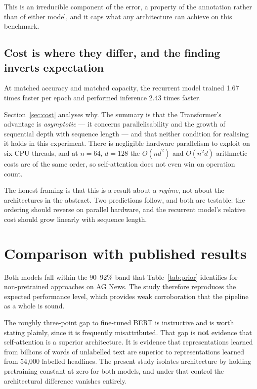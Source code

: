 This is an irreducible component of the error, a property of the annotation rather than of either
model, and it caps what any architecture can achieve on this benchmark.

\subsection{Cost is where they differ, and the finding inverts expectation}

At matched accuracy and matched capacity, the recurrent model trained 1.67 times faster per epoch
and performed inference 2.43 times faster.

Section~\ref{sec:cost} analyses why. The summary is that the Transformer's advantage is
\emph{asymptotic} --- it concerns parallelisability and the growth of sequential depth with
sequence length --- and that neither condition for realising it holds in this experiment. There is
negligible hardware parallelism to exploit on six CPU threads, and at $n = 64$, $d = 128$ the
$O(n d^2)$ and $O(n^2 d)$ arithmetic costs are of the same order, so self-attention does not even
win on operation count.

The honest framing is that this is a result about a \emph{regime}, not about the architectures in
the abstract. Two predictions follow, and both are testable: the ordering should reverse on
parallel hardware, and the recurrent model's relative cost should grow linearly with sequence
length.

\section{Comparison with published results}

Both models fall within the 90--92\% band that Table~\ref{tab:prior} identifies for non-pretrained
approaches on AG News. The study therefore reproduces the expected performance level, which
provides weak corroboration that the pipeline as a whole is sound.

The roughly three-point gap to fine-tuned BERT is instructive and is worth stating plainly, since
it is frequently misattributed. That gap is \textbf{not} evidence that self-attention is a superior
architecture. It is evidence that representations learned from billions of words of unlabelled text
are superior to representations learned from 54{,}000 labelled headlines. The present study
isolates architecture by holding pretraining constant at zero for both models, and under that
control the architectural difference vanishes entirely.

